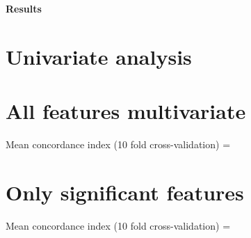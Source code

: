 \documentclass[11pt]{article}
\begin{document}
\renewcommand\thesection{}
\renewcommand\thesubsection{}
\renewcommand\thesubsubsection{}
\selectfont
{}
\graphicspath{
}
\setlength{\parindent}{0mm}
\textbf{\Huge{Results}}

\renewcommand{\cfttoctitlefont}{\normalfont\MakeUppercase}
\renewcommand{\contentsname}{}
\tableofcontents

\vskip2cm
\newpage
\vskip2cm
\renewcommand\thesection{}
\def\spaceV{\vskip0.5cm}
\newpage
\section{Univariate analysis}
\begin{center}

\end{center}

\newpage
\section{All features multivariate}
Mean concordance index (10 fold cross-validation) = 
\vskip2cm
\begin{center}

\end{center}

\newpage
\section{Only significant features}
Mean concordance index (10 fold cross-validation) = 
\vskip2cm
\begin{center}

\end{center}
\end{document}

